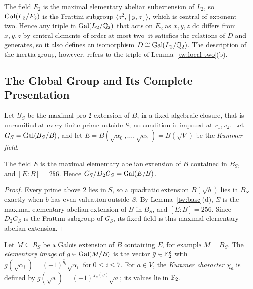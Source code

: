 \begin{remark}\label{tw:triple-remark}
The field $E_2$ is the maximal elementary abelian subextension of $L_2$, so
$\operatorname{Gal}(L_2/E_2)$ is the Frattini subgroup $\langle z^2,[y,z]\rangle$, which is
central of exponent two. Hence any triple in $\operatorname{Gal}(L_2/\mathbb Q_2)$ that acts on
$E_2$ as $x,y,z$ do differs from $x,y,z$ by central elements of order at
most two; it satisfies the relations of $D$ and generates, so it also
defines an isomorphism $D\cong\operatorname{Gal}(L_2/\mathbb Q_2)$. The description of the
inertia group, however, refers to the triple of
Lemma~\ref{tw:local-two}(b).
\end{remark}

\subsection{The Global Group and Its Complete Presentation}\label{tw:global-section}
Let $B_S$ be the maximal pro-$2$ extension of $B$, in a fixed algebraic
closure, that is unramified at every finite prime outside $S$; no condition
is imposed at $v_1,v_2$. Let $G_S=\operatorname{Gal}(B_S/B)$, and let
$E=B(\sqrt{\alpha_0},\dots,\sqrt{\alpha_7})=B(\sqrt V)$ be the
\emph{Kummer field}.

\begin{lemma}\label{tw:kummer-field}
The field $E$ is the maximal elementary abelian extension of $B$ contained in
$B_S$, and $[E:B]=256$. Hence $G_S/D_2G_S=\operatorname{Gal}(E/B)$.
\end{lemma}

\begin{proof}
Every prime above $2$ lies in $S$, so a quadratic extension $B(\sqrt b)$ lies
in $B_S$ exactly when $b$ has even valuation outside $S$. By
Lemma~\ref{tw:base}(d), $E$ is the maximal elementary abelian extension of
$B$ in $B_S$, and $[E:B]=256$. Since $D_2G_S$ is the Frattini subgroup of
$G_S$, its fixed field is this maximal elementary abelian extension.
\end{proof}

\begin{definition}\label{tw:elementary-image}
Let $M\subseteq B_S$ be a Galois extension of $B$ containing $E$, for
example $M=B_S$. The \emph{elementary image} of $g\in\operatorname{Gal}(M/B)$ is the vector
$\bar g\in\mathbb F_2^8$ with $g(\sqrt{\alpha_i})=(-1)^{\bar g_i}\sqrt{\alpha_i}$ for
$0\le i\le7$. For $a\in V$, the \emph{Kummer character} $\chi_a$ is defined by
$g(\sqrt a)=(-1)^{\chi_a(g)}\sqrt a$; its values lie in $\mathbb F_2$.
\end{definition}


